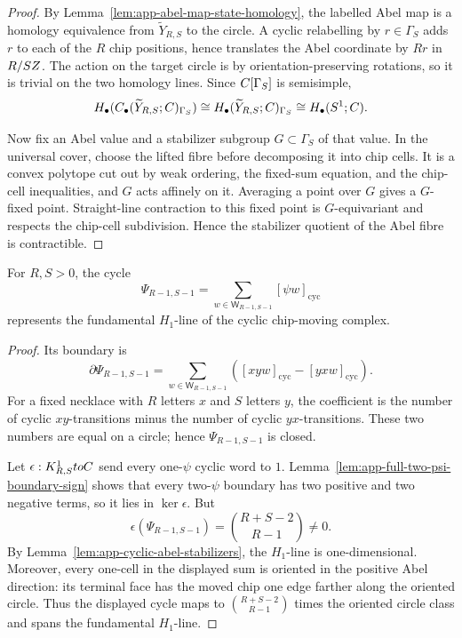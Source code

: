 \begin{proof}
  By Lemma~\ref{lem:app-abel-map-state-homology}, the labelled Abel map is
  a homology equivalence from \(\widetilde Y_{R,S}\) to the circle.  A
  cyclic relabelling by \(r\in \Gamma_S\) adds \(r\) to each of the \(R\) chip
  positions, hence translates the Abel coordinate by \(Rr\) in
  \(R/SZ\).  The action on the target circle is by
  orientation-preserving rotations, so it is trivial on the two homology
  lines.  Since \(C[\Gamma_S]\) is semisimple,
  \[
    H_\bullet(C_\bullet(\widetilde Y_{R,S};C)_{\Gamma_S})
      \cong H_\bullet(\widetilde Y_{R,S};C)_{\Gamma_S}
      \cong H_\bullet(S^1;C).
  \]

  Now fix an Abel value and a stabilizer subgroup \(G\subset \Gamma_S\) of that
  value.  In the universal cover, choose the lifted fibre before decomposing
  it into chip cells.  It is a convex polytope cut out by weak ordering, the
  fixed-sum equation, and the chip-cell inequalities, and \(G\) acts affinely
  on it.  Averaging a point over \(G\) gives a \(G\)-fixed point.  Straight-line
  contraction to this fixed point is \(G\)-equivariant and respects the
  chip-cell subdivision.  Hence the stabilizer quotient of the Abel fibre is
  contractible.
\end{proof}

\begin{lem}[\(S^1\) generator]
\label{lem:app-full-s1-generator}
  For \(R,S>0\), the cycle
  \[
    \Psi_{R-1,S-1}
      =
      \sum_{w\in\mathsf W_{R-1,S-1}}[\psi w]_{\mathrm{cyc}}
  \]
  represents the fundamental \(H_1\)-line of the cyclic chip-moving
  complex.
\end{lem}

\begin{proof}
  Its boundary is
  \[
    \partial\Psi_{R-1,S-1}
      =
      \sum_{w\in\mathsf W_{R-1,S-1}}
      ([xyw]_{\mathrm{cyc}}-[yxw]_{\mathrm{cyc}}).
  \]
  For a fixed necklace with \(R\) letters \(x\) and \(S\) letters \(y\),
  the coefficient is the number of cyclic \(xy\)-transitions minus the
  number of cyclic \(yx\)-transitions.  These two numbers are equal on a
  circle; hence \(\Psi_{R-1,S-1}\) is closed.

  Let \(\epsilon:K^1_{R,S}toC\) send every one-\(\psi\) cyclic word to
  \(1\).  Lemma~\ref{lem:app-full-two-psi-boundary-sign} shows that every
  two-\(\psi\) boundary has two positive and two negative terms, so it
  lies in \(\ker\epsilon\).  But
  \[
    \epsilon(\Psi_{R-1,S-1})=\binom{R+S-2}{R-1}\neq0.
  \]
  By Lemma~\ref{lem:app-cyclic-abel-stabilizers}, the \(H_1\)-line is
  one-dimensional.  Moreover, every one-cell in the displayed sum is oriented
  in the positive Abel direction: its terminal face has the moved chip one edge
  farther along the oriented circle.  Thus the displayed cycle maps to
  \(\binom{R+S-2}{R-1}\) times the oriented circle class and spans the
  fundamental \(H_1\)-line.
\end{proof}

